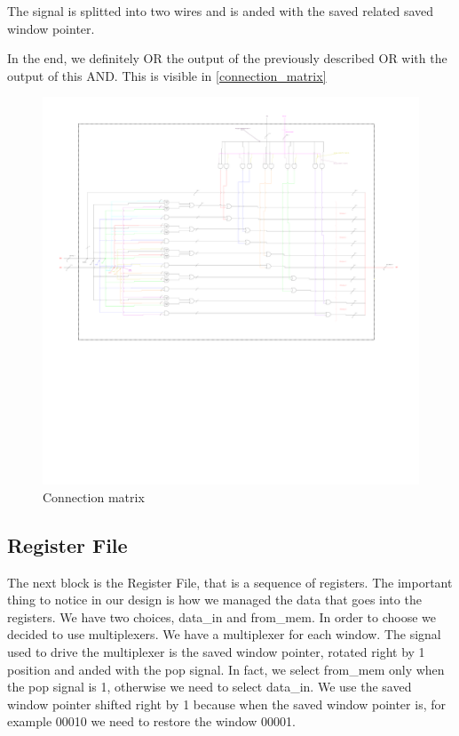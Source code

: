 The signal is splitted into two wires and is anded with the saved related saved window pointer. 

In the end, we definitely OR the output of the previously described OR with the output of this AND. This is visible in \autoref{connection_matrix}

\begin{figure}[ht]
  \centering
  \addtolength{\leftskip}{-3cm}
  \addtolength{\rightskip}{-3cm}
  \includegraphics[width=1.4\textwidth]{chapters/4_DecodeStage/images/connection_matrix.pdf}
  \caption{Connection matrix}
  \label{connection_matrix}
\end{figure}

\newpage

\subsection{Register File}

The next block is the Register File, that is a sequence of registers. The important thing to notice in our design is how we managed the data that goes into the registers. We have two choices, data\_in and from\_mem. In order to choose we decided to use multiplexers. 
We have a multiplexer for each window. The signal used to drive the multiplexer is the saved window pointer, rotated right by 1 position and anded with the pop signal. In fact, we select from\_mem only when the pop signal is 1, otherwise we need to select data\_in. 
We use the saved window pointer shifted right by 1 because when the saved window pointer is, for example 00010 we need to restore the window 00001. 

